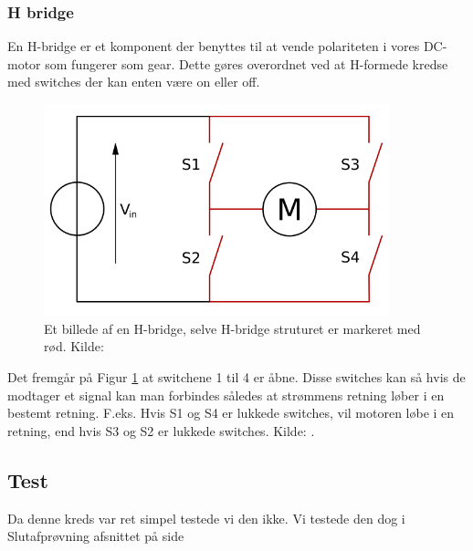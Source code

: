 \subsubsection{H bridge}\label{subs:hbridgeTeori}
En H-bridge er et komponent der benyttes til at vende polariteten i vores DC-motor som fungerer som gear. Dette gøres overordnet ved at H-formede kredse med switches der kan enten være on eller off. 
\begin{figure}[H]
	\centering
    \includegraphics[width=10cm]{figures/2_4_3hastighed/hbridge.png}
	\caption{Et billede af en H-bridge, selve H-bridge struturet er markeret med rød. Kilde: \cite{teorihbridge}}
	\label{fig:hbridge}
\end{figure}
Det fremgår på Figur \ref{fig:hbridge} at switchene 1 til 4 er åbne. Disse switches kan så hvis de modtager et signal kan man forbindes således at strømmens retning løber i en bestemt retning. F.eks. Hvis S1 og S4 er lukkede switches, vil motoren løbe i en retning, end hvis S3 og S2 er lukkede switches. Kilde: \cite{teorihbridge}. 




\subsection{Test}

Da denne kreds var ret simpel testede vi den ikke. Vi testede den dog i Slutafprøvning afsnittet på side \pageref{sluttest}